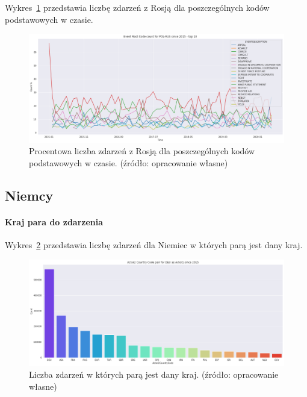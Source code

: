 \documentclass[11pt]{report}
\begin{document}
    Wykres~\ref{fig:PLRUSERC} przedstawia liczbę zdarzeń z Rosją dla poszczególnych kodów podstawowych w czasie.
    \begin{figure}[!htp]
        \centering
        \includegraphics[width=\linewidth]{fig/PL/POLRUSERCperc.png}
        \caption{Procentowa liczba zdarzeń z Rosją dla poszczególnych kodów podstawowych w czasie. (źródło: opracowanie własne)}
        \label{fig:PLRUSERC}
    \end{figure}

    \subsection{Niemcy}

    \paragraph{Kraj para do zdarzenia}

    Wykres~\ref{fig:DEUpair} przedstawia liczbę zdarzeń dla Niemiec w których parą jest dany kraj.

    \begin{figure}[!htp]
        \centering
        \includegraphics[width=\linewidth]{fig/DEU/DEUactor2Pair.png}
        \caption{Liczba zdarzeń w których parą jest dany kraj. (źródło: opracowanie własne)}
        \label{fig:DEUpair}
    \end{figure}
\end{document}

